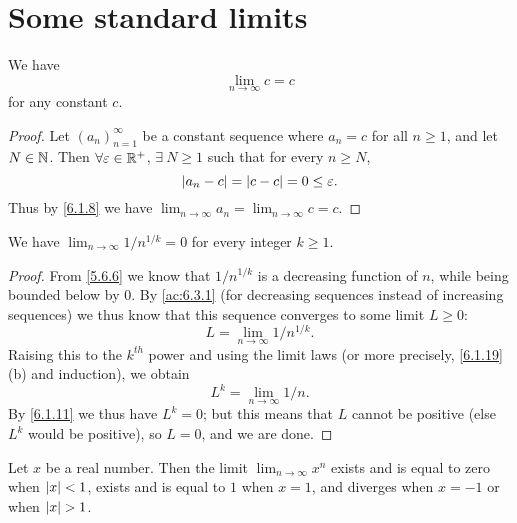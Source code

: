 \section{Some standard limits}\label{sec:6.5}

\begin{ac}\label{ac:6.5.1}
  We have
  \[
    \lim_{n \to \infty} c = c
  \]
  for any constant \(c\).
\end{ac}

\begin{proof}
  Let \((a_n)_{n = 1}^\infty\) be a constant sequence where \(a_n = c\) for all \(n \geq 1\), and let \(N \in \mathbb{N}\).
  Then \(\forall \varepsilon \in \mathbb{R}^+\), \(\exists\ N \geq 1\) such that for every \(n \geq N\),
  \[
    \left\lvert a_n - c\right\rvert = \left\lvert c - c\right\rvert = 0 \leq \varepsilon.
  \]
  Thus by \cref{6.1.8} we have \(\lim_{n \to \infty} a_n = \lim_{n \to \infty} c = c\).
\end{proof}

\begin{cor}\label{6.5.1}
  We have \(\lim_{n \to \infty} 1 / n^{1 / k} = 0\) for every integer \(k \geq 1\).
\end{cor}

\begin{proof}
  From \cref{5.6.6} we know that \(1 / n^{1 / k}\) is a decreasing function of \(n\), while being bounded below by \(0\).
  By \cref{ac:6.3.1} (for decreasing sequences instead of increasing sequences) we thus know that this sequence converges to some limit \(L \geq 0\):
  \[
    L = \lim_{n \to \infty} 1 / n^{1 / k}.
  \]
  Raising this to the \(k^{th}\) power and using the limit laws (or more precisely, \cref{6.1.19}(b) and induction), we obtain
  \[
    L^k = \lim_{n \to \infty} 1 / n.
  \]
  By \cref{6.1.11} we thus have \(L^k = 0\);
  but this means that \(L\) cannot be positive (else \(L^k\) would be positive), so \(L = 0\), and we are done.
\end{proof}

\begin{lem}\label{6.5.2}
  Let \(x\) be a real number.
  Then the limit \(\lim_{n \to \infty} x^n\) exists and is equal to zero when \(\left\lvert x\right\rvert < 1\), exists and is equal to \(1\) when \(x = 1\), and diverges when \(x = -1\) or when \(\left\lvert x\right\rvert > 1\).
\end{lem}


